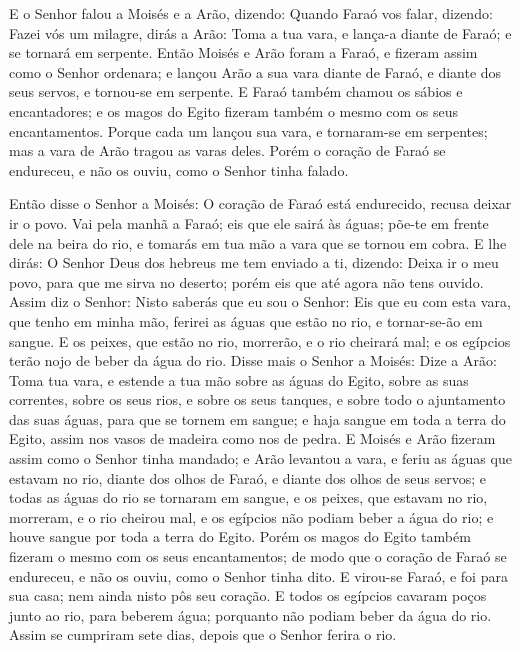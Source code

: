 E o Senhor falou a Moisés e a Arão, dizendo: Quando Faraó vos
falar, dizendo: Fazei vós um milagre, dirás a Arão: Toma a tua vara,
e lança-a diante de Faraó; e se tornará em serpente. Então
Moisés e Arão foram a Faraó, e fizeram assim como o Senhor ordenara;
e lançou Arão a sua vara diante de Faraó, e diante dos seus servos,
e tornou-se em serpente. E Faraó também chamou os sábios e
encantadores; e os magos do Egito fizeram também o mesmo com os seus
encantamentos. Porque cada um lançou sua vara, e tornaram-se
em serpentes; mas a vara de Arão tragou as varas deles. Porém
o coração de Faraó se endureceu, e não os ouviu, como o Senhor tinha
falado.

Então disse o Senhor a Moisés: O coração de Faraó está
endurecido, recusa deixar ir o povo. Vai pela manhã a Faraó;
eis que ele sairá às águas; põe-te em frente dele na beira do rio, e
tomarás em tua mão a vara que se tornou em cobra. E lhe
dirás: O Senhor Deus dos hebreus me tem enviado a ti, dizendo: Deixa
ir o meu povo, para que me sirva no deserto; porém eis que até agora
não tens ouvido. Assim diz o Senhor: Nisto saberás que eu sou
o Senhor: Eis que eu com esta vara, que tenho em minha mão, ferirei
as águas que estão no rio, e tornar-se-ão em sangue. E os
peixes, que estão no rio, morrerão, e o rio cheirará mal; e os
egípcios terão nojo de beber da água do rio. Disse mais o
Senhor a Moisés: Dize a Arão: Toma tua vara, e estende a tua mão
sobre as águas do Egito, sobre as suas correntes, sobre os seus
rios, e sobre os seus tanques, e sobre todo o ajuntamento das suas
águas, para que se tornem em sangue; e haja sangue em toda a terra
do Egito, assim nos vasos de madeira como nos de pedra. E
Moisés e Arão fizeram assim como o Senhor tinha mandado; e Arão
levantou a vara, e feriu as águas que estavam no rio, diante dos
olhos de Faraó, e diante dos olhos de seus servos; e todas as águas
do rio se tornaram em sangue, e os peixes, que estavam no
rio, morreram, e o rio cheirou mal, e os egípcios não podiam beber a
água do rio; e houve sangue por toda a terra do Egito. Porém
os magos do Egito também fizeram o mesmo com os seus encantamentos;
de modo que o coração de Faraó se endureceu, e não os ouviu, como o
Senhor tinha dito. E virou-se Faraó, e foi para sua casa; nem
ainda nisto pôs seu coração. E todos os egípcios cavaram
poços junto ao rio, para beberem água; porquanto não podiam beber da
água do rio. Assim se cumpriram sete dias, depois que o
Senhor ferira o rio.

\medskip

